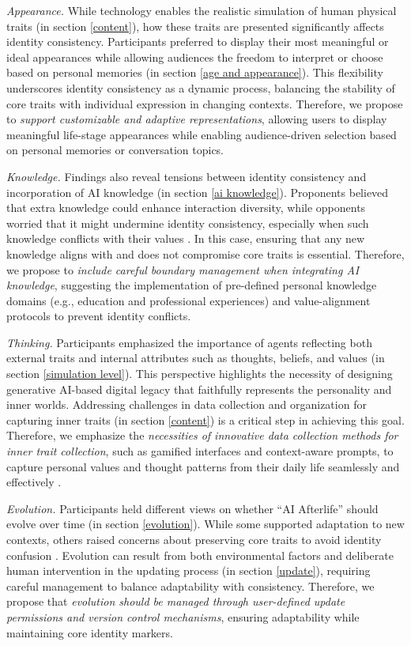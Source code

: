 \textit{Appearance.} 
While technology enables the realistic simulation of human physical traits (in section \ref{content}), how these traits are presented significantly affects identity consistency. Participants preferred to display their most meaningful or ideal appearances while allowing audiences the freedom to interpret or choose based on personal memories (in section \ref{age and appearance}). This flexibility underscores identity consistency as a dynamic process, balancing the stability of core traits with individual expression in changing contexts. 
Therefore, we propose to \textit{support customizable and adaptive representations}, allowing users to display meaningful life-stage appearances while enabling audience-driven selection based on personal memories or conversation topics.

\textit{Knowledge.}
Findings also reveal tensions between identity consistency and incorporation of AI knowledge (in section \ref{ai knowledge}). Proponents believed that extra knowledge could enhance interaction diversity, while opponents worried that it might undermine identity consistency, especially when such knowledge conflicts with their values \cite{hume2000treatise}. In this case, ensuring that any new knowledge aligns with and does not compromise core traits is essential. 
Therefore, we propose to \textit{include careful boundary management when integrating AI knowledge}, suggesting the implementation of pre-defined personal knowledge domains (e.g., education and professional experiences) and value-alignment protocols to prevent identity conflicts.

\textit{Thinking.}
Participants emphasized the importance of agents reflecting both external traits and internal attributes such as thoughts, beliefs, and values \cite{locke1847essay} (in section \ref{simulation level}). This perspective highlights the necessity of designing generative AI-based digital legacy that faithfully represents the personality and inner worlds. Addressing challenges in data collection and organization for capturing inner traits (in section \ref{content}) is a critical step in achieving this goal. 
Therefore, we emphasize the \textit{necessities of innovative data collection methods for inner trait collection}, such as gamified interfaces and context-aware prompts, to capture personal values and thought patterns from their daily life seamlessly and effectively \cite{rabbi2017sara, wilson2005context, dergousoff2015mobile}. 

\textit{Evolution.}
Participants held different views on whether ``AI Afterlife'' should evolve over time (in section \ref{evolution}). While some supported adaptation to new contexts, others raised concerns about preserving core traits to avoid identity confusion \cite{marcia1966development, taylor1989sources}. Evolution can result from both environmental factors and deliberate human intervention in the updating process (in section \ref{update}), requiring careful management to balance adaptability with consistency. 
Therefore, we propose that \textit{evolution should be managed through user-defined update permissions and version control mechanisms}, ensuring adaptability while maintaining core identity markers. 

